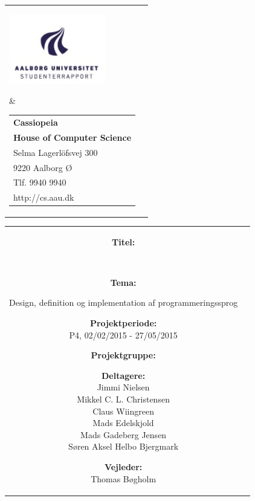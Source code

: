 \begin{titlepage}
    \setlength{\textwidth}{15cm}
	\noindent
	\begin{nopagebreak}
	{\samepage 
			\begin{tabular}{lr}
				\parbox{0.5\textwidth}{\raisebox{11mm}
					{\includegraphics[height=3.0cm]{Figurer/Billeder/aauLogo.jpg}}
				} &
				\parbox{0.5\textwidth}{
					\small
					\begin{tabular}{l}
						{\sf\small \textbf{Cassiopeia}}\\
						{\sf\small \textbf{House of Computer Science}} \\
						{\sf\small Selma Lagerlöfsvej 300} \\
						{\sf\small 9220 Aalborg Ø} \\
						{\sf\small Tlf. 9940 9940} \\
						{\sf\small http://cs.aau.dk}
					\end{tabular}
				}
			\end{tabular}
			
			\noindent
			\begin{tabular}{cc}
				\parbox{7cm}{
					\begin{description}
			
						\item {\bf Titel:} 
			
							\textbf{\rapportnavn}\\
							
			  
						\item {\bf Tema:}

							Design, definition og implementation af programmeringssprog
			
						\item {\bf Projektperiode:}\\
			  				P4, 02/02/2015 - 27/05/2015
			 				\hspace{4cm}
						\item {\bf Projektgruppe:}\\
							\gruppenummer
			  				\hspace{4cm}
						\item {\bf Deltagere:}\\
							Jimmi Nielsen\\
							Mikkel C. L. Christensen\\
							Claus Wiingreen\\
							Mads Edelskjold\\
							Mads Gadeberg Jensen\\
							Søren Aksel Helbo Bjergmark
							\hspace{2cm}
						\item {\bf Vejleder:}\\
							Thomas Bøgholm


\end{description}}
\end{tabular}}
\end{nopagebreak}
\end{titlepage}
